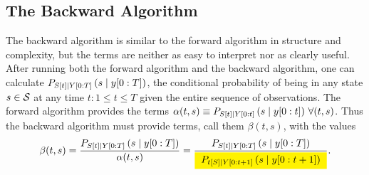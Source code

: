 \subsection{The Backward Algorithm}
\label{sec:backward}

\newcommand{\Backcast}[3]{%
  \colorbox{pink}{%
    $P_{\ti{S}{#1}\given \ti{S}{#2}} \left(s \given #3 \right)$%
  }%
}%
\newcommand{\BackUpdate}[1]{%
  \colorbox{green}{%
    $P_{\ti{Y}{#1}\given \ti{S}{#1}} \left(\ti{y}{t} \given s \right)$%
  }%
}%
\newcommand{\FuturePast}{%
  \colorbox{orange}{%
    $P\left( \ts{y}{t+1}{T}\given  \ts{y}{0}{t+1} \right)$%
  }%
}%
The  backward algorithm is similar to the
forward algorithm in structure and complexity, but the terms are
neither as easy to interpret nor as clearly useful.  After running
both the forward algorithm and the backward algorithm, one can
calculate $P_{{S}{[t]}\mid Y[0:T]} \left(s\mid y[0:T] \right)$,
the conditional probability of being in any state $s \in \states$ at
any time $t: 1\leq t \leq T$ given the entire sequence of
observations.  The forward algorithm provides the terms $\alpha(t,s)
\equiv P_{{S}{[t]}\mid Y[0:t]} \left(s\mid y[0:t] \right)\,
\forall (t,s)$.  Thus the backward algorithm must provide terms, call
them $\beta(t,s)$, with the values
\begin{equation}
  \label{eq:bw1} \beta(t,s) =
  \frac{P_{\ti{S}{t}\given \ts{Y}{0}{T}} \left(s\given \ts{y}{0}{T} \right)}
  {\alpha(t,s)} = \frac{P_{\ti{S}{t}\given \ts{Y}{0}{T}}
    \left(s\given \ts{y}{0}{T} \right)}
  {\alphax{t}{S}{t+1}{s}}.
\end{equation}
